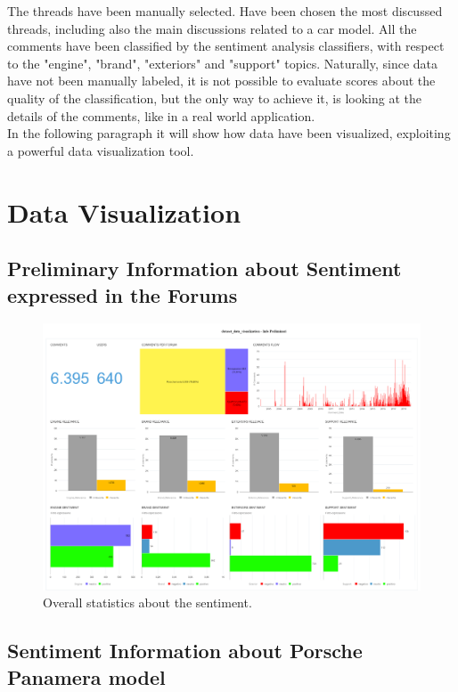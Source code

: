 The threads have been manually selected. Have been chosen the most discussed threads, including also the main discussions related to a car model. All the comments have been classified by the sentiment analysis classifiers, with respect to the "engine", "brand", "exteriors" and "support" topics. Naturally, since data have not been manually labeled, it is not possible to evaluate scores about the quality of the classification, but the only way to achieve it, is looking at the details of the comments, like in a real world application.\\
In the following paragraph it will show how data have been visualized, exploiting a powerful data visualization tool.


\section{Data Visualization}




\subsection{Preliminary Information about Sentiment expressed in the Forums}


\begin{figure}[H]
	\centering
	\includegraphics[width=\textwidth]{figures/odv_export/dataset_data_visualization_1.pdf}
	\caption{Overall statistics about the sentiment.}
	\label{fig:preliminar-info}
\end{figure}




\subsection{Sentiment Information about Porsche Panamera model}

